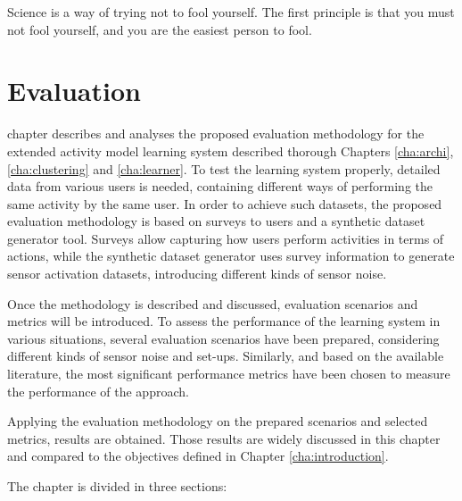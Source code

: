 

\begin{savequote}[50mm]
Science is a way of trying not to fool yourself. The first principle is that you must not fool yourself, and you are the easiest person to fool.
\end{savequote}


\chapter{Evaluation}
\label{cha:evaluation}

\ifpdf
    \graphicspath{{6_evaluation/figures/PDF/}{6_evaluation/figures/PNG/}{6_evaluation/figures/}}
\else
    \graphicspath{{6_evaluation/figures/EPS/}{6_evaluation/figures/}}
\fi

 chapter describes and analyses the proposed evaluation methodology for the extended activity model learning system described thorough Chapters \ref{cha:archi}, \ref{cha:clustering} and \ref{cha:learner}. To test the learning system properly, detailed data from various users is needed, containing different ways of performing the same activity by the same user. In order to achieve such datasets, the proposed evaluation methodology is based on surveys to users and a synthetic dataset generator tool. Surveys allow capturing how users perform activities in terms of actions, while the synthetic dataset generator uses survey information to generate sensor activation datasets, introducing different kinds of sensor noise. 

Once the methodology is described and discussed, evaluation scenarios and metrics will be introduced. To assess the performance of the learning system in various situations, several evaluation scenarios have been prepared, considering different kinds of sensor noise and set-ups. Similarly, and based on the available literature, the most significant performance metrics have been chosen to measure the performance of the approach.

Applying the evaluation methodology on the prepared scenarios and selected metrics, results are obtained. Those results are widely discussed in this chapter and compared to the objectives defined in Chapter \ref{cha:introduction}.

The chapter is divided in three sections:

